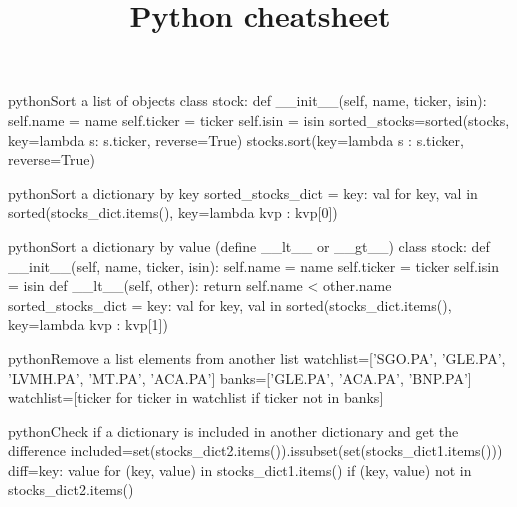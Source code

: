 \documentclass[10pt,a4paper]{article}
\title{\color{w3schools}Python cheatsheet
}
\begin{document}
\maketitle

\small
\begin{multicols}{3}

\thispagestyle{empty}
\scriptsize



\begin{codebox}{python}{Sort a list of objects}
class stock:
    def __init__(self, name, ticker, isin):
self.name = name
self.ticker = ticker
self.isin = isin
sorted_stocks=sorted(stocks, key=lambda s: s.ticker, reverse=True)
stocks.sort(key=lambda s : s.ticker, reverse=True)

\end{codebox}

\begin{codebox}{python}{Sort a dictionary by key}
sorted_stocks_dict = {key: val for key, val     
    in sorted(stocks_dict.items(), key=lambda kvp : kvp[0])}

\end{codebox}

\begin{codebox}{python}{Sort a dictionary by value (define \_\_lt\_\_ or \_\_gt\_\_)}
class stock:
    def __init__(self, name, ticker, isin):
self.name = name
self.ticker = ticker
self.isin = isin
    def __lt__(self, other):
return self.name < other.name
sorted_stocks_dict = {key: val for key, val     
    in sorted(stocks_dict.items(), key=lambda kvp : kvp[1])}

\end{codebox}

\begin{codebox}{python}{Remove a list elements from another list}
watchlist=['SGO.PA', 'GLE.PA', 'LVMH.PA', 'MT.PA', 'ACA.PA']
banks=['GLE.PA', 'ACA.PA', 'BNP.PA']
watchlist=[ticker for ticker in watchlist if ticker not in banks]

\end{codebox}

\begin{codebox}{python}{Check if a dictionary is included in another dictionary and get the difference}
included=set(stocks_dict2.items()).issubset(set(stocks_dict1.items()))
diff={key: value for (key, value) in stocks_dict1.items() 
    if (key, value) not in stocks_dict2.items()}

\end{codebox}


\end{multicols}
\end{document}
